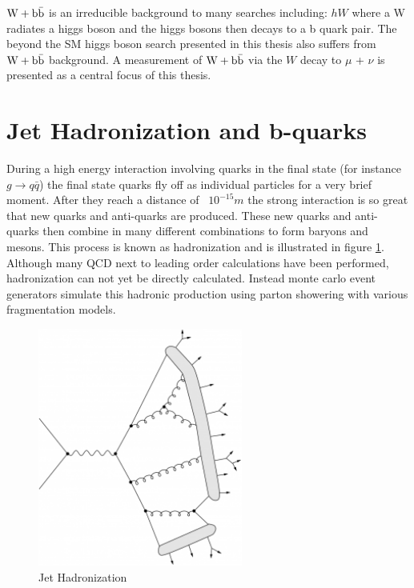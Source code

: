 $\mathrm{W+\mathrm{b\bar{b}}}$ is an irreducible background to many searches including:
$hW$ where a W radiates a higgs boson and the higgs bosons then decays to a b quark pair. 
The beyond the SM higgs boson search presented in this thesis also suffers
from $\mathrm{W+\mathrm{b\bar{b}}}$ background. 
A measurement of $\mathrm{W+\mathrm{b\bar{b}}}$ via the $W$ decay to $\mu$ + $\nu$ is presented as a 
central focus of this thesis.

\section{Jet Hadronization and b-quarks}
During a high energy interaction involving quarks in the final state (for instance $g\rightarrow q\bar{q}$)
the final state quarks fly off as individual particles for a very brief moment. After they reach
a distance of ~$10^{-15}m$ the strong interaction is so great that new quarks and anti-quarks
are produced. These new quarks and anti-quarks then combine in many different combinations
to form baryons and mesons. This process is known as hadronization 
and is illustrated in figure \ref{fig:JetHadronization}. Although many QCD
next to leading order calculations have been performed, hadronization can not yet be directly calculated.
Instead monte carlo event generators simulate this hadronic production using parton 
showering with various fragmentation models.%

\begin{figure}[t]
  \centering
	\includegraphics[width=0.6\textwidth]{images/stringModel.png}
  	\caption[Jet Hadronization]
   	{Jet Hadronization}
	\label{fig:JetHadronization}
\end{figure}


